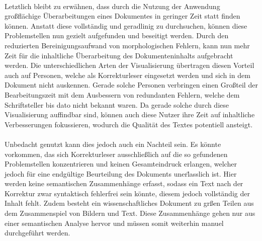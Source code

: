 \\
Letztlich bleibt zu erw\"ahnen, dass durch die Nutzung der Anwendung gro{\ss}fl\"achige \"Uberarbeitungen eines Dokumentes in geringer Zeit statt finden k\"onnen. Anstatt diese vollst\"andig und geradlinig zu durchsuchen, k\"onnen diese Problemstellen nun gezielt aufgefunden und beseitigt werden. Durch den reduzierten Bereinigungsaufwand von morphologischen Fehlern, kann nun mehr Zeit f\"ur die inhaltliche \"Uberarbeitung des Dokumenteninhalts aufgebracht werden. Die unterschiedlichen Arten der Visualisierung \"ubertragen diesen Vorteil auch auf Personen, welche als Korrekturleser eingesetzt werden und sich in dem Dokument nicht auskennen. Gerade solche Personen verbringen einen Gro{\ss}teil der Bearbeitungszeit mit dem Ausbessern von redundanten Fehlern, welche dem Schriftsteller bis dato nicht bekannt waren. Da gerade solche durch diese Visualisierung auffindbar sind, k\"onnen auch diese Nutzer ihre Zeit auf inhaltliche Verbesserungen fokussieren, wodurch die Qualit\"at des Textes potentiell ansteigt.\\
\\
Unbedacht genutzt kann dies jedoch auch ein Nachteil sein. Es k\"onnte vorkommen, das sich Korrekturleser ausschlie{\ss}lich auf die so gefundenen Problemstellen konzentrieren und keinen Gesamteindruck erlangen, welcher jedoch f\"ur eine endg\"ultige Beurteilung des Dokuments uner\"lasslich ist. Hier werden keine semantischen Zusammenh\"ange erfasst, sodass ein Text nach der Korrektur zwar syntaktisch fehlerfrei sein k\"onnte, diesem jedoch vollst\"andig der Inhalt fehlt. Zudem besteht ein wissenschaftliches Dokument zu gr{\ss}en Teilen aus dem Zusammenspiel von Bildern und Text. Diese Zusammenh\"ange gehen nur aus einer semantischen Analyse hervor und m\"ussen somit weiterhin manuel durchgef\"uhrt werden.\\